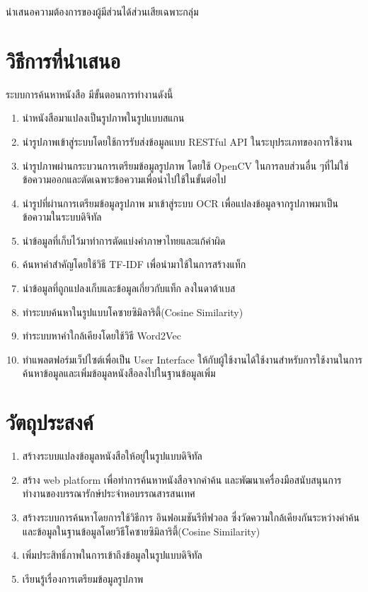นำเสนอความต้องการของผู้มีส่วนได้ส่วนเสียเฉพาะกลุ่ม 

\section{วิธีการที่นำเสนอ}

ระบบการค้นหาหนังสือ มีขั้นตอนการทำงานดังนี้

\begin{enumerate}
    \item นำหนังสือมาแปลงเป็นรูปภาพในรูปแบบสแกน
    \item นำรูปภาพเข้าสู่ระบบโดยใช้การรับส่งข้อมูลแบบ RESTful API ในระบุประเภทของการใช้งาน
    \item นำรูปภาพผ่านกระบวนการเตรียมข้อมูลรูปภาพ โดยใช้ OpenCV ในการลบส่วนอื่น ๆที่ไม่ใช่ข้อความออกและตัดเฉพาะข้อความเพื่อนำไปใช้ในขั้นต่อไป
    \item นำรูปที่ผ่านการเตรียมข้อมูลรูปภาพ มาเข้าสู่ระบบ OCR เพื่อแปลงข้อมูลจากรูปภาพมาเป็นข้อความในระบบดิจิทัล
    \item นำข้อมูลที่เก็บไว้มาทำการตัดแบ่งคำภาษาไทยและแก้คำผิด
    \item ค้นหาคำสำคัญโดยใช้วิธี TF-IDF เพื่อนำมาใช้ในการสร้างแท็ก 
    \item นำข้อมูลที่ถูกแปลงเก็บและข้อมูลเกี่ยวกับแท็ก ลงในดาต้าเบส 
    \item ทำระบบค้นหาในรูปแบบโคซายซิมิลาริตี้(Cosine Similarity) 
    \item ทำระบบหาคำใกล้เคียงโดยใช้วิธี Word2Vec
    \item ทำแพลตฟอร์มเว็ปไซต์เพื่อเป็น User Interface ให้กับผู้ใช้งานได้ใช้งานสำหรับการใช้งานในการค้นหาข้อมูลและเพิ่มข้อมูลหนังสือลงไปในฐานข้อมูลเพิ่ม
\end{enumerate}
\section{วัตถุประสงค์}
\begin{enumerate}
    \item สร้างระบบแปลงข้อมูลหนังสือให้อยู่ในรูปแบบดิจิทัล
    \item สร้าง web platform เพื่อทำการค้นหาหนังสือจากคำค้น และพัฒนาเครื่องมือสนับสนุนการทำงานของบรรณารักษ์ประจำหอบรรณสารสนเทศ
    \item สร้างระบบการค้นหาโดยการใช้วิธีการ อินฟอเมชันรีทีฟวอล ซึ่งวัดความใกล้เคียงกันระหว่างคำค้นและข้อมูลในฐานข้อมูลโดยวิธีโคซายซิมิลาริตี้(Cosine Similarity)
    \item เพิ่มประสิทธิ์ภาพในการเข้าถึงข้อมูลในรูปแบบดิจิทัล
    \item เรียนรู้เรื่องการเตรียมข้อมูลรูปภาพ
\end{enumerate}
